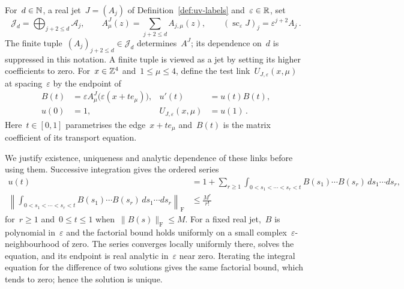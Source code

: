 \begin{definition}\label{def:uv-test-links}
For~$d\in\mathbb N$, a real jet~$J=(A_j)$ of Definition~\ref{def:uv-labels} and~$\varepsilon\in\mathbb R$, set
\begin{equation}\label{eq:uv-truncated-connection}
 \mathcal J_d=\bigoplus_{j+2\le d}\mathcal A_j,\qquad
 A_\mu^J(z)=\sum_{j+2\le d}A_{j,\mu}(z),\qquad
 (\operatorname{sc}_\varepsilon J)_j=\varepsilon^{j+2}A_j\,.
\end{equation}
The finite tuple~$(A_j)_{j+2\le d}\in\mathcal J_d$ determines~$A^J$; its dependence on~$d$ is suppressed in this notation.
A finite tuple is viewed as a jet by setting its higher coefficients to zero.
For~$x\in\mathbb Z^4$ and~$1\le\mu\le4$, define the test link~$U_{J,\varepsilon}(x,\mu)$ at spacing~$\varepsilon$ by the endpoint of
\begin{equation}\label{eq:uv-link-ode}
 \begin{aligned}
 B(t)&=\varepsilon A_\mu^J\bigl(\varepsilon(x+te_\mu)\bigr), & u'(t)&=u(t)B(t),\\
 u(0)&=1, & U_{J,\varepsilon}(x,\mu)&=u(1)\,.
 \end{aligned}
\end{equation}
Here~$t\in[0,1]$ parametrises the edge~$x+te_\mu$ and~$B(t)$ is the matrix coefficient of its transport equation.
\end{definition}

We justify existence, uniqueness and analytic dependence of these links before using them. Successive integration gives the ordered series
\begin{equation}\label{eq:uv-transport-series}
 \begin{aligned}
 u(t)&=1+\sum_{r\ge1}\int_{0<s_1<\cdots<s_r<t}
          B(s_1)\cdots B(s_r)\,ds_1\cdots ds_r,\\
 \left\|\int_{0<s_1<\cdots<s_r<t}B(s_1)\cdots B(s_r)\,ds_1\cdots ds_r\right\|_{\mathrm F}
 &\le\frac{M^r}{r!}
 \end{aligned}
\end{equation}
for~$r\ge1$ and~$0\le t\le1$ when~$\|B(s)\|_{\mathrm F}\le M$. For a fixed real jet,~$B$ is polynomial in~$\varepsilon$ and the factorial bound holds uniformly on a small complex~$\varepsilon$-neighbourhood of zero. The series converges locally uniformly there, solves the equation, and its endpoint is real analytic in~$\varepsilon$ near zero. Iterating the integral equation for the difference of two solutions gives the same factorial bound, which tends to zero; hence the solution is unique.

